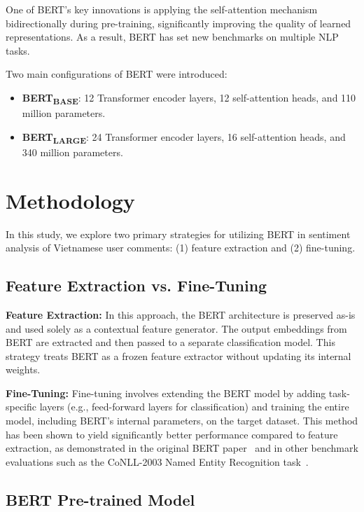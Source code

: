 \documentclass[11pt]{article}
\begin{document}
One of BERT’s key innovations is applying the self-attention mechanism bidirectionally during pre-training, significantly improving the quality of learned representations. As a result, BERT has set new benchmarks on multiple NLP tasks.

Two main configurations of BERT were introduced:
\begin{itemize}
    \item \textbf{BERT\textsubscript{BASE}}: 12 Transformer encoder layers, 12 self-attention heads, and 110 million parameters.
    \item \textbf{BERT\textsubscript{LARGE}}: 24 Transformer encoder layers, 16 self-attention heads, and 340 million parameters.
\end{itemize}



\section{Methodology}
\label{sec:methodology}
In this study, we explore two primary strategies for utilizing BERT in sentiment analysis of Vietnamese user comments: (1) feature extraction and (2) fine-tuning.

\subsection{Feature Extraction vs. Fine-Tuning}

\textbf{Feature Extraction:} In this approach, the BERT architecture is preserved as-is and used solely as a contextual feature generator. The output embeddings from BERT are extracted and then passed to a separate classification model. This strategy treats BERT as a frozen feature extractor without updating its internal weights.

\textbf{Fine-Tuning:} Fine-tuning involves extending the BERT model by adding task-specific layers (e.g., feed-forward layers for classification) and training the entire model, including BERT's internal parameters, on the target dataset. This method has been shown to yield significantly better performance compared to feature extraction, as demonstrated in the original BERT paper~\cite{BERTJacob} and in other benchmark evaluations such as the CoNLL-2003 Named Entity Recognition task~\cite{sang2003introduction}.

\subsection{BERT Pre-trained Model}
\end{document}
